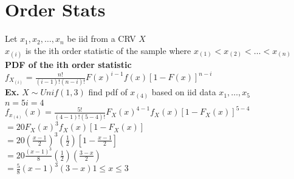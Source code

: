 \documentclass{article}
\begin{document}
\section{Order Stats}
\label{sec:order}
Let $x_1,x_2,\dots,x_n$ be iid from a CRV $X$\\
$x_{(i)}$ is the ith order statistic of the sample where $x_{(1)}<x_{(2)}<\dots<x_{(n)}$\\
\textbf{PDF of the ith order statistic}\\
$f_{X_{(i)}}=\frac{n!}{(i-1)!(n-i)!}F(x)^{i-1}f(x)[1-F(x)]^{n-i}$\\
\textbf{Ex.} $X\sim Unif(1,3)$ find pdf of $x_{(4)}$ based on iid data $x_1,\dots,x_5$\\
$n=5$\hspace*{0.25in}$i=4$\\
$f_{x_{(4)}}(x)=\frac{5!}{(4-1)!(5-4)!}F_X(x)^{4-1}f_X(x)[1-F_X(x)]^{5-4}$\\
\hspace*{0.49in}$=20F_X(x)^3f_X(x)[1-F_X(x)]$\\
\hspace*{0.49in}$=20(\frac{x-1}{2})^3(\frac{1}{2})[1-\frac{x-1}{2}]$\\
\hspace*{0.49in}$=20\frac{(x-1)^3}{8}(\frac{1}{2})(\frac{3-x}{2})$\\
\hspace*{0.49in}$=\frac{5}{8}(x-1)^3(3-x)$\hspace*{0.25in}$1\leq x\leq 3$
\end{document}
